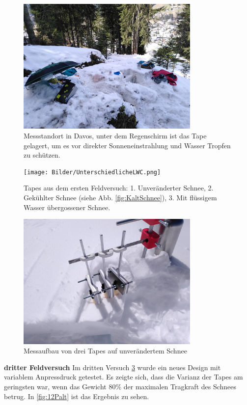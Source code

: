 \begin{figure}[H]
    \centering
    \includegraphics[width=0.8\textwidth]{Bilder/IMG_20240411_124421.jpg}
    \caption{Messstandort in Davos, unter dem Regenschirm ist das Tape gelagert, um es vor direkter Sonneneinstrahlung und Wasser Tropfen zu schützen.} 
    \label{fig:DavosMessung}
\end{figure}

\begin{figure}[H]
    \centering
    \texttt{[image: Bilder/UnterschiedlicheLWC.png]}
    \caption{Tapes aus dem ersten Feldversuch: 1. Unveränderter Schnee, 2. Gekühlter Schnee (siehe Abb. \ref{fig:KaltSchnee}),  3. Mit flüssigem Wasser übergossener Schnee.} 
    \label{fig:DavosMessungErg}
\end{figure}


\newpage


\label{drittFeldVer}

\begin{figure}[H]
    \centering
    \includegraphics[width=0.8\textwidth]{Bilder/aufbauTitlis.jpeg}
    \caption{Messaufbau von drei Tapes auf unverändertem Schnee} 
    \label{fig:aufbauTitlis}
\end{figure}
\textbf{dritter Feldversuch}
Im dritten Versuch \ref{fig:aufbauTitlis} wurde ein neues Design mit variablem Anpressdruck getestet. Es zeigte sich, dass die Varianz der Tapes am geringsten war, wenn das Gewicht 80\% der maximalen Tragkraft des Schnees betrug. In \ref{fig:12Palt} ist das Ergebnis zu sehen.

